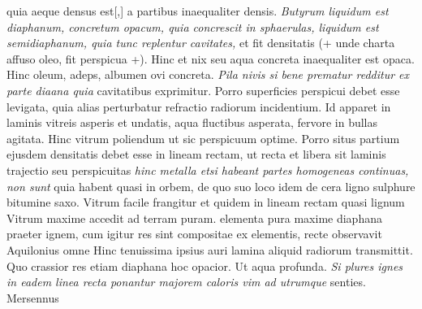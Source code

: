 quia aeque densus est[,]
 a partibus inaequaliter densis.
\textit{Butyrum liquidum\protect{} est diaphanum, concretum opacum, quia concrescit in sphaerulas, liquidum est semidiaphanum, quia tunc replentur cavitates,} et fit densitatis  (+ unde charta affuso oleo\protect{}, fit perspicua +).
Hinc et nix seu aqua concreta inaequaliter est opaca\protect{}. Hinc oleum, adeps, albumen ovi\protect{} concreta. \textit{Pila nivis\protect{} si bene prematur redditur ex parte diaana quia } cavitatibus exprimitur. Porro superficies perspicui debet esse levigata, quia alias perturbatur refractio radiorum\protect{} incidentium. Id apparet in laminis vitreis\protect{} asperis et undatis, aqua fluctibus asperata\protect{}, fervore in bullas\protect{} agitata. Hinc vitrum poliendum ut sic perspicuum optime. Porro situs partium ejusdem densitatis debet esse in lineam rectam, ut recta et libera sit laminis trajectio seu perspicuitas\protect{} \textit{hinc metalla etsi habeant partes homogeneas continuas, non sunt 
} quia habent quasi in orbem, de quo suo loco idem de cera\protect{} ligno sulphure\protect{} bitumine saxo\protect{}. Vitrum facile frangitur et quidem in lineam rectam quasi lignum  Vitrum maxime accedit ad terram puram.  elementa pura maxime diaphana praeter ignem, cum igitur res sint compositae ex elementis, recte observavit
Aquilonius\protect{} omne   Hinc tenuissima ipsius auri lamina\protect{} aliquid radiorum transmittit. Quo crassior res etiam diaphana hoc opacior. Ut aqua profunda. \textit{Si plures ignes in eadem linea recta ponantur majorem caloris vim\protect{} ad utrumque } senties. Mersennus\protect{}
